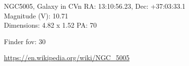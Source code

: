 \begin{block}{NGC5005, Galaxy in CVn}
    RA: 13:10:56.23, Dec: +37:03:33.1 \\ 
    Magnitude (V): 10.71 \\ 
    Dimensions: 4.82 x 1.52 PA: 70 

    Finder fov: 30 

    \url{https://en.wikipedia.org/wiki/NGC_5005} 
\end{block}